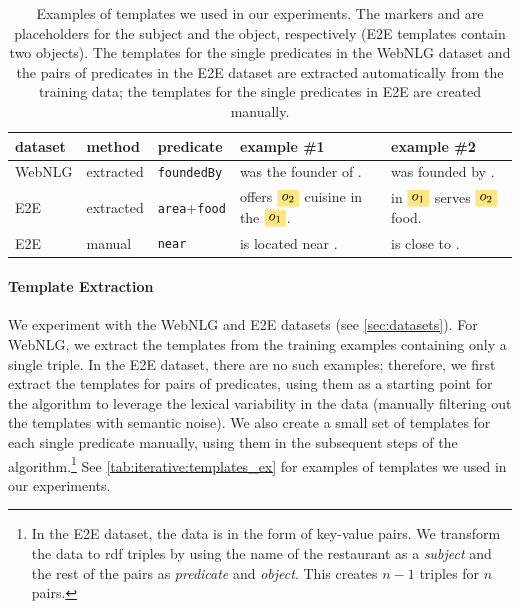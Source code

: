 \begin{table}[t]
    \centering\footnotesize
    \begin{tabular}{@{}lllll@{}}
        \textbf{dataset} & \textbf{method} & \textbf{predicate}          & \textbf{example \#1}                       & \textbf{example \#2}                \\\midrule
        WebNLG           & extracted       & \texttt{foundedBy}          & \et{} was the founder of \eh{}.            & \eh{} was founded by \et{}.         \\
        E2E              & extracted       & \texttt{area}+\texttt{food} & \eh{} offers $\ets$ cuisine in the $\etf$. & \eh{} in $\etf$ serves $\ets$ food. \\
        E2E              & manual          & \texttt{near}               & \eh{} is located near \et{}.               & \et{} is close to \eh{}.
    \end{tabular}
    \caption[Examples of templates used for our experiments.]{Examples of templates we used in our experiments. The markers \eh{} and \et{} are placeholders for the subject and the object, respectively (E2E templates contain two objects). The templates for the single predicates in the WebNLG dataset and the pairs of predicates in the E2E dataset are extracted automatically from the training data; the templates for the single predicates in E2E are created manually.}
    \label{tab:iterative:templates_ex}
\end{table}


\paragraph{Template Extraction} We experiment with the WebNLG and E2E datasets (see \autoref{sec:datasets}). For WebNLG, we extract the templates from the training examples containing only a single triple. In the E2E dataset, there are no such examples; therefore, we first extract the templates for pairs of predicates, using them as a starting point for the algorithm to leverage the lexical variability in the data (manually filtering out the templates with semantic noise). We also create a small set of templates for each single predicate manually, using them in the subsequent steps of the algorithm.\footnote{In the E2E dataset, the data is in the form of key-value pairs. We transform the data to \ac{rdf} triples by using the name of the restaurant as a \emph{subject} and the rest of the pairs as \emph{predicate} and \emph{object}. This creates $n-1$ triples for $n$ pairs.} See \autoref{tab:iterative:templates_ex} for examples of templates we used in our experiments.

